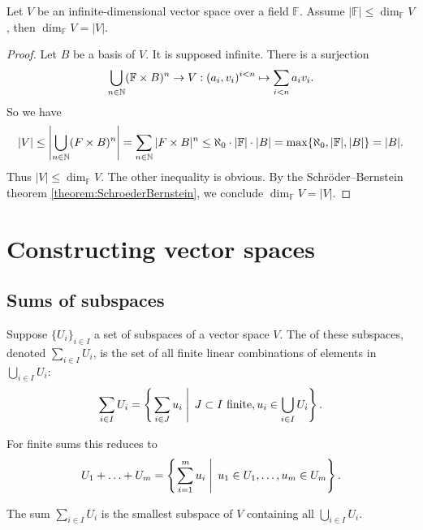 \begin{lemma}
Let $V$ be an infinite-dimensional vector space over a field $\mathbb{F}$. Assume $|\mathbb{F}|\leq \dim_{\mathbb{F}} V$, then $\dim_{\mathbb{F}} V = |V|$. \label{lemma:vsCardinality}
\end{lemma}
\begin{proof}
Let $B$ be a basis of $V$. It is supposed infinite. There is a surjection
\[\bigcup_{n\in\mathbb{N}}(\mathbb{F}\times B)^{n} \to V: (a_i,v_i)^{i<n} \mapsto \sum_{i<n}a_iv_i. \]
So we have
\[ |V| \leq \left|\bigcup_{n\in\mathbb{N}}(F\times B)^{n}\right| = \sum_{n\in \mathbb{N}}|F\times B|^n \leq \aleph_0\cdot |\mathbb{F}| \cdot |B| = \max\{\aleph_0, |\mathbb{F}|, |B|\} = |B|. \]
Thus $|V|\leq \dim_{\mathbb{F}} V$. The other inequality is obvious. By the Schröder–Bernstein theorem \ref{theorem:SchroederBernstein}, we conclude $\dim_{\mathbb{F}} V = |V|$.
\end{proof}

\section{Constructing vector spaces}
\subsection{Sums of subspaces}
\begin{definition}
Suppose $\{U_i\}_{i\in I}$ a set of subspaces of a vector space $V$. The  of these subspaces, denoted $\sum_{i\in I}U_i$, is the set of all finite linear combinations of elements in $\bigcup_{i\in I}U_i$:
\[ \sum_{i\in I}U_i =  \left\{\left. \sum_{i\in J} u_i \;\right|\; \text{$J\subset I$ finite}, u_i\in \bigcup_{i\in I}U_i \right\}. \]
\end{definition}
For finite sums this reduces to
\[ U_1+\ldots + U_m = \left\{\left. \sum_{i=1}^m u_i \;\right|\; u_1\in U_1, \ldots, u_m\in U_m \right\}. \]

\begin{proposition}
The sum $\sum_{i\in I}U_i$ is the smallest subspace of $V$ containing all $\bigcup_{i\in I}U_i$.
\end{proposition}

